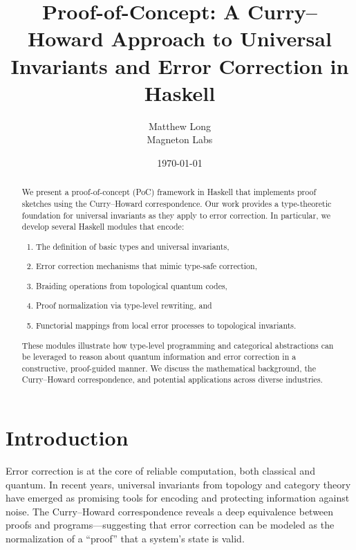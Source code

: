 \documentclass[12pt]{article}
\title{\textbf{Proof-of-Concept: A Curry–Howard Approach to Universal Invariants and Error Correction in Haskell}}
\author{Matthew Long \\
Magneton Labs}
\date{\today}
\begin{document}
\maketitle

\begin{abstract}
We present a proof-of-concept (PoC) framework in Haskell that implements proof sketches using the Curry–Howard correspondence. Our work provides a type-theoretic foundation for universal invariants as they apply to error correction. In particular, we develop several Haskell modules that encode:
\begin{enumerate}[label=(\alph*)]
  \item The definition of basic types and universal invariants,
  \item Error correction mechanisms that mimic type-safe correction,
  \item Braiding operations from topological quantum codes,
  \item Proof normalization via type-level rewriting, and
  \item Functorial mappings from local error processes to topological invariants.
\end{enumerate}
These modules illustrate how type-level programming and categorical abstractions can be leveraged to reason about quantum information and error correction in a constructive, proof-guided manner. We discuss the mathematical background, the Curry–Howard correspondence, and potential applications across diverse industries.
\end{abstract}

\tableofcontents

\newpage

\section{Introduction}

Error correction is at the core of reliable computation, both classical and quantum. In recent years, universal invariants from topology and category theory have emerged as promising tools for encoding and protecting information against noise. The Curry–Howard correspondence reveals a deep equivalence between proofs and programs---suggesting that error correction can be modeled as the normalization of a “proof” that a system’s state is valid.
\end{document}
